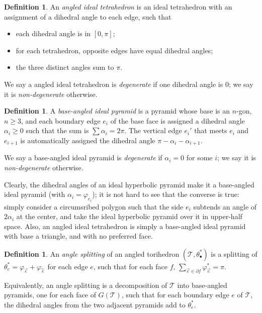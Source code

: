 \documentclass[11pt]{amsart}
\newcommand{\sT}{{\mathcal{T}}}
\newcommand{\cev}[1]{\overset{\leftarrow}{#1}}
\newcommand{\del}{\partial}
\newcommand{\vphi}{\varphi}
\theoremstyle{plain}
\theoremstyle{definition}
\newtheorem{define}[theorem]{Definition}
\newtheorem{definition}[theorem]{Definition}
\begin{document}
\begin{define}
An \emph{angled ideal tetrahedron} is an ideal tetrahedron with an assignment of a dihedral angle
to each edge, such that
\begin{itemize}
\item each dihedral angle is in $[0, \pi]$;
\item for each tetrahedron, opposite edges have equal dihedral angles;
\item the three distinct angles sum to $\pi$.
\end{itemize}

We say a angled ideal tetrahedron is \emph{degenerate} if
one dihedral angle is 0; we say it is \emph{non-degenerate} otherwise.
\end{define}


\begin{define}
A \emph{base-angled ideal pyramid}
is a pyramid whose base is an $n$-gon, $n \geq 3$,
and each boundary edge $e_i$ of the base face is assigned a dihedral angle
$\alpha_i \geq 0$ such that the sum is $\sum \alpha_i = 2\pi$.
The vertical edge $e_i'$ that meets $e_i$ and $e_{i+1}$
is automatically assigned the dihedral angle $\pi - \alpha_i - \alpha_{i+1}$.


We say a base-angled ideal pyramid is \emph{degenerate} if
$\alpha_i = 0$ for some $i$; we say it is \emph{non-degenerate} otherwise.
\end{define}


Clearly, the dihedral angles of an ideal hyperbolic pyramid
make it a base-angled ideal pyramid
(with $\alpha_i = \vphi_{e_i}$);
it is not hard to see that the converse is true:
simply consider a circumsribed polygon such that the side $e_i$
subtends an angle of $2\alpha_i$ at the center,
and take the ideal hyperbolic pyramid over it in upper-half space.
Also, an angled ideal tetrahedron is simply a base-angled ideal pyramid
with base a triangle, and with no preferred face.

\begin{definition}
An \emph{angle splitting} of an angled torihedron $(\sT,\theta_\bullet^*)$
is a splitting of $\theta_e^* = \vphi_{\vec{e}} + \vphi_{\cev{e}}$
for each edge $e$,
such that for each face $f$,
$\sum_{\vec{e} \in \del f} \vphi_{\vec{e}}^* = \pi$.

Equivalently, an angle splitting is a decomposition of
$\sT$ into base-angled pyramids,
one for each face of $G(\sT)$, such that
for each boundary edge $e$ of $\sT$,
the dihedral angles from the two adjacent pyramids
add to $\theta_e^*$.
\end{definition}
\end{document}
